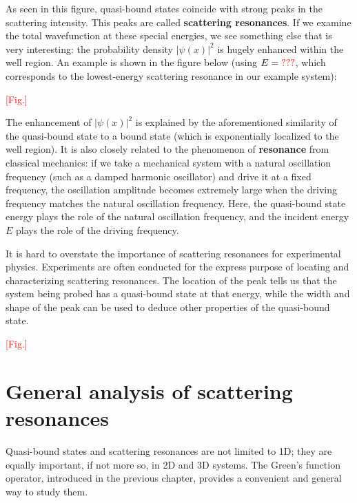 \documentclass[pra,11pt]{revtex4}
\begin{document}
As seen in this figure, quasi-bound states coincide with strong peaks
in the scattering intensity.  This peaks are called \textbf{scattering
  resonances}.  If we examine the total wavefunction at these special
energies, we see something else that is very interesting: the
probability density $|\psi(x)|^2$ is hugely enhanced within the well
region.  An example is shown in the figure below (using $E =
\textcolor{red}{???}$, which corresponds to the lowest-energy
scattering resonance in our example system):

\textcolor{red}{[Fig.]}

The enhancement of $|\psi(x)|^2$ is explained by the aforementioned
similarity of the quasi-bound state to a bound state (which is
exponentially localized to the well region).  It is also closely
related to the phenomenon of \textbf{resonance} from classical
mechanics: if we take a mechanical system with a natural oscillation
frequency (such as a damped harmonic oscillator) and drive it at a
fixed frequency, the oscillation amplitude becomes extremely large
when the driving frequency matches the natural oscillation frequency.
Here, the quasi-bound state energy plays the role of the natural
oscillation frequency, and the incident energy $E$ plays the role of
the driving frequency.

It is hard to overstate the importance of scattering resonances for
experimental physics.  Experiments are often conducted for the express
purpose of locating and characterizing scattering resonances.  The
location of the peak tells us that the system being probed has a
quasi-bound state at that energy, while the width and shape of the
peak can be used to deduce other properties of the quasi-bound state.


\textcolor{red}{[Fig.]}


\section{General analysis of scattering resonances}

Quasi-bound states and scattering resonances are not limited to 1D;
they are equally important, if not more so, in 2D and 3D systems.  The
Green's function operator, introduced in the previous chapter,
provides a convenient and general way to study them.
\end{document}
